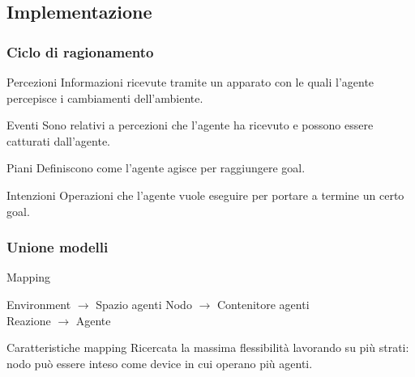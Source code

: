\documentclass[handout]{beamer}\mode<presentation>{\usetheme{AMSCesenaBleu}}
\begin{document}
\subsection{Implementazione}
\begin{frame}
\frametitle{Ciclo di ragionamento}
\begin{block}{Percezioni}
Informazioni ricevute tramite un apparato con le quali l'agente percepisce i cambiamenti dell'ambiente.
\end{block}

\begin{block}{Eventi}
Sono relativi a percezioni che l'agente ha ricevuto e possono essere catturati dall'agente.
\end{block}

\begin{block}{Piani}
Definiscono come l'agente agisce per raggiungere goal.
\end{block}

\begin{block}{Intenzioni}
Operazioni che l'agente vuole eseguire per portare a termine un certo goal.
\end{block}
\end{frame}



\begin{frame}
\frametitle{Unione modelli}
\begin{block}{Mapping}
\begin{center}
\alert{Environment} $\rightarrow$ Spazio agenti \hspace{1.5cm} \alert{Nodo} $\rightarrow$ Contenitore agenti
\\\vspace{0.4cm}
\alert{Reazione} $\rightarrow$ Agente
\end{center}
\end{block}

\begin{block}{Caratteristiche mapping}
Ricercata la massima flessibilità lavorando su più strati: nodo può essere inteso come device in cui operano più agenti.
\end{block}
\end{frame}
\end{document}
